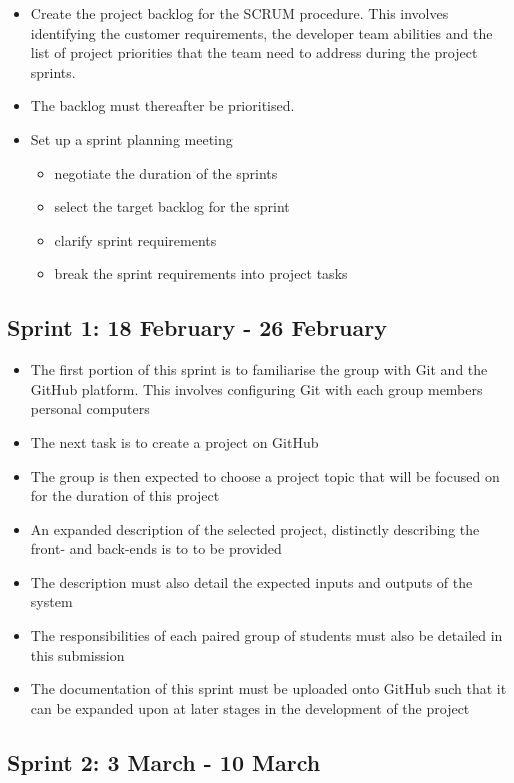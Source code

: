 \documentclass[10pt,twocolumn]{witseiepaper}
\begin{document}
	\begin{itemize}
		\item Create the project backlog for the SCRUM procedure. This involves identifying the customer requirements, the developer team abilities and the list of project priorities that the team need to address during the project sprints. 
		\item The backlog must thereafter be prioritised. 
		\item Set up a sprint planning meeting
		\begin{itemize}
			\item negotiate the duration of the sprints 
			\item select the target backlog for the sprint
			\item clarify sprint requirements
			\item break the sprint requirements into project tasks
		\end{itemize}
	\end{itemize}
	
	\subsection{Sprint 1: 18 February - 26 February}
	
	\begin{itemize}
		\item The first portion of this sprint is to familiarise the group with Git and the GitHub platform. This involves configuring Git with each group members personal computers 
		\item The next task is to create a project on GitHub
		\item The group is then expected to choose a project topic that will be focused on for the duration of this project
		\item An expanded description of the selected project, distinctly describing the front- and back-ends is to to be provided
		\item The description must also detail the expected inputs and outputs of the system
		\item The responsibilities of each paired group of students must also be detailed in this submission
		\item The documentation of this sprint must be uploaded onto GitHub such that it can be expanded upon at later stages in the development of the project
	\end{itemize}
	
	\subsection{Sprint 2: 3 March - 10 March}
	
\end{document}
